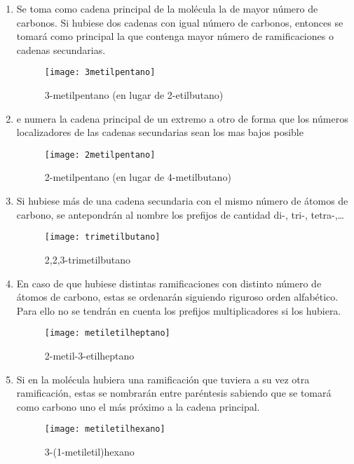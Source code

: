\begin{enumerate}
	
	\item Se toma como cadena principal de la molécula la de mayor número de carbonos. Si hubiese dos cadenas con igual número de carbonos, entonces se tomará como principal la que contenga mayor número de ramificaciones o cadenas secundarias.
	\begin{figure}[h!]
		\centering
		\texttt{[image: 3metilpentano]}
		\captionsetup{labelformat=empty}
		\caption{3-metilpentano (en lugar de 2-etilbutano)}
	\end{figure}
	\item e numera la cadena principal de un extremo a otro de forma que los números localizadores de las cadenas secundarias sean los mas bajos posible
	\begin{figure}[h!]
		\centering
		\texttt{[image: 2metilpentano]}
		\captionsetup{labelformat=empty}
		\caption{2-metilpentano (en lugar de 4-metilbutano)}
	\end{figure}
	\item Si hubiese más de una cadena secundaria con el mismo número de átomos de carbono, se antepondrán al nombre los  prefijos de cantidad di-, tri-, tetra-,…
	\begin{figure}[h!]
		\centering
		\texttt{[image: trimetilbutano]}
		\captionsetup{labelformat=empty}
		\caption{2,2,3-trimetilbutano}
	\end{figure}
	\item En caso de que hubiese distintas ramificaciones con distinto número de átomos de carbono, estas se ordenarán siguiendo riguroso orden alfabético. Para ello no se tendrán en cuenta los prefijos multiplicadores si los hubiera.
	\begin{figure}[h!]
		\centering
		\texttt{[image: metiletilheptano]}
		\captionsetup{labelformat=empty}
		\caption{2-metil-3-etilheptano}
	\end{figure}
	\item Si en la molécula hubiera una ramificación que tuviera a su vez otra ramificación, estas se nombrarán entre paréntesis sabiendo que se tomará como carbono uno el más próximo a la cadena principal.
	 \begin{figure}[h!]
	 	\centering
	 	\texttt{[image: metiletilhexano]}
	 	\captionsetup{labelformat=empty}
	 	\caption{3-(1-metiletil)hexano}
	 \end{figure}
 \setcounter{nx}{\value{enumi}}
\end{enumerate}

